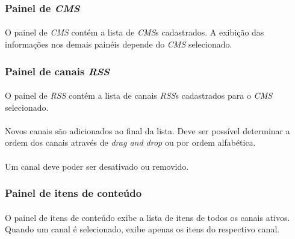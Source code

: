 \documentclass[a4paper,12pt]{article}
\def\cms{\emph{CMS}}
\def\rss{\emph{RSS}}
\def\dragndrop{\emph{drag and drop}}
\begin{document}
\subsubsection{Painel de \cms{}}

\paragraph{}
O painel de \cms{} contém a lista de \cms{}s cadastrados. A exibição das informações nos demais painéis depende do \cms{} selecionado.

\subsubsection{Painel de canais \rss{}}

\paragraph{}
O painel de \rss{} contém a lista de canais \rss{}s cadastrados para o \cms{}
selecionado.


\paragraph{}
Novos canais são adicionados ao final da lista. Deve ser possível determinar a
ordem dos canais através de \dragndrop{} ou por ordem alfabética.

\paragraph{}
Um canal deve poder ser desativado ou removido. 

\subsubsection{Painel de itens de conteúdo}

\paragraph{}
O painel de itens de conteúdo exibe a lista de itens de todos os canais ativos.
Quando um canal é selecionado, exibe apenas os itens do respectivo canal.
\end{document}
